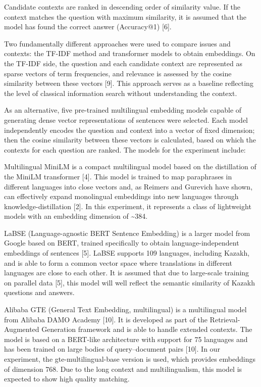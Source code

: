 \begin{multicols}{2}
Candidate contexts are ranked in descending order of similarity value.
If the context matches the question with maximum similarity, it is
assumed that the model has found the correct answer (Accuracy@1)
{[}6{]}.

Two fundamentally different approaches were used to compare issues and
contexts: the TF-IDF method and transformer models to obtain embeddings.
On the TF-IDF side, the question and each candidate context are
represented as sparse vectors of term frequencies, and relevance is
assessed by the cosine similarity between these vectors {[}9{]}. This
approach serves as a baseline reflecting the level of classical
information search without understanding the context.

As an alternative, five pre-trained multilingual embedding models
capable of generating dense vector representations of sentences were
selected. Each model independently encodes the question and context into
a vector of fixed dimension; then the cosine similarity between these
vectors is calculated, based on which the contexts for each question are
ranked. The models for the experiment include:

Multilingual MiniLM is a compact multilingual model based on the
distillation of the MiniLM transformer {[}4{]}. This model is trained to
map paraphrases in different languages into close vectors and, as
Reimers and Gurevich have shown, can effectively expand monolingual
embeddings into new languages through knowledge-distillation {[}2{]}. In
this experiment, it represents a class of lightweight models with an
embedding dimension of \textasciitilde384.

LaBSE (Language-agnostic BERT Sentence Embedding) is a larger model from
Google based on BERT, trained specifically to obtain
language-independent embeddings of sentences {[}5{]}. LaBSE supports 109
languages, including Kazakh, and is able to form a common vector space
where translations in different languages are close to each other. It is
assumed that due to large-scale training on parallel data {[}5{]}, this
model will well reflect the semantic similarity of Kazakh questions and
answers.

Alibaba GTE (General Text Embedding, multilingual) is a multilingual
model from Alibaba DAMO Academy {[}10{]}. It is developed as part of the
Retrieval-Augmented Generation framework and is able to handle extended
contexts. The model is based on a BERT-like architecture with support
for 75 languages and has been trained on large bodies of query--document
pairs {[}10{]}. In our experiment, the gte-multilingual-base version is
used, which provides embeddings of dimension 768. Due to the long
context and multilingualism, this model is expected to show high quality
matching.


\end{multicols}
